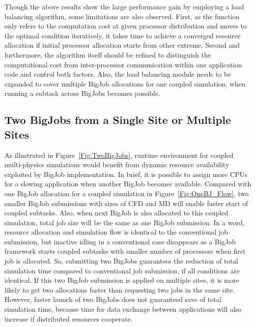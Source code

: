 \documentclass[conference,final]{IEEEtran}
\begin{document}
Though the above results show the large performance gain by employing
a load balancing algorithm, some limitations are also observed. First,
as the function only refers to the computation cost at given processor
distribution and moves to the optimal condition iteratively, it takes
time to achieve a converged resource allocation if initial processor
allocation starts from other extreme. Second and furthermore, the
algorithm itself should be refined to distinguish the computational
cost from inter-processor communication within one application code
and control both factors. Also, the load balancing module needs to be
expanded to cover multiple BigJob allocations for one coupled
simulation, when running a subtask across BigJobs becomes possible.

\subsection{Two BigJobs from a Single Site or Multiple Sites}


As illustrated in Figure~\ref{Fig:TwoBigJobs}, runtime environment for
coupled multi-physics simulations would benefit from dynamic resource
availability exploited by BigJob implementation. In brief, it is
possible to assign more CPUs for a slowing application when another
BigJob becomes available. Compared with one BigJob allocation for a
coupled simulation in Figure~\ref{Fig:OneBJ_Flow}, two smaller BigJob
submissions with sizes of CFD and MD will enable faster start of
coupled subtasks. Also, when next BigJob is also allocated to this
coupled simulation, total job size will be the same as one BigJob
submission. In a word, resource allocation and simulation flow is
identical to the conventional job submission, but inactive idling in a
conventional case disappears as a BigJob framework starts coupled
subtasks with smaller number of processors when first job is
allocated. So, submitting two BigJobs guarantees the reduction of
total simulation time compared to conventional job submission, if all
conditions are identical. If this two BigJob submission is applied on
multiple sites, it is more likely to get two allocations faster than
requesting two jobs in the same site. However, faster launch of two
BigJobs does not guaranteed save of total simulation time, because
time for data exchange between applications will also increase if
distributed resources cooperate.
\end{document}
